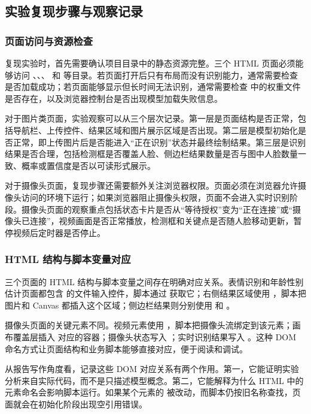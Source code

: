 \subsection{实验复现步骤与观察记录}

\subsubsection{页面访问与资源检查}

复现实验时，首先需要确认项目目录中的静态资源完整。三个 HTML 页面必须能够访问 、、、 和  等目录。若页面打开后只有布局而没有识别能力，通常需要检查  是否加载成功；若页面能够显示但长时间无法识别，通常需要检查  中的权重文件是否存在，以及浏览器控制台是否出现模型加载失败信息。

对于图片类页面，实验观察可以从三个层次记录。第一层是页面结构是否正常，包括导航栏、上传控件、结果区域和图片展示区域是否出现。第二层是模型初始化是否正常，即上传图片后是否能进入“正在识别”状态并最终绘制结果。第三层是识别结果是否合理，包括检测框是否覆盖人脸、侧边栏结果数量是否与图中人脸数量一致、概率或置信度是否以可读形式展示。

对于摄像头页面，复现步骤还需要额外关注浏览器权限。页面必须在浏览器允许摄像头访问的环境下运行；如果浏览器阻止摄像头权限，页面不会进入实时识别阶段。摄像头页面的观察重点包括状态卡片是否从“等待授权”变为“正在连接”或“摄像头已连接”，视频画面是否正常播放，检测框和关键点是否随人脸移动更新，暂停视频后定时器是否停止。

\subsubsection{HTML 结构与脚本变量对应}

三个页面的 HTML 结构与脚本变量之间存在明确对应关系。表情识别和年龄性别估计页面都包含  的文件输入控件，脚本通过  获取它；右侧结果区域使用 ，脚本把图片和 Canvas 都插入这个区域；侧边栏结果则分别使用  和 。

摄像头页面的关键元素不同。视频元素使用 ，脚本把摄像头流绑定到该元素；画布覆盖层插入  对应的容器；摄像头状态写入 ；实时识别结果写入 。这种 DOM 命名方式让页面结构和业务脚本能够直接对应，便于阅读和调试。

从报告写作角度看，记录这些 DOM 对应关系有两个作用。第一，它能证明实验分析来自实际代码，而不是只描述模型概念。第二，它能解释为什么 HTML 中的元素命名会影响脚本运行。如果某个元素的  被改动，而脚本仍按旧名称查找，页面就会在初始化阶段出现空引用错误。

